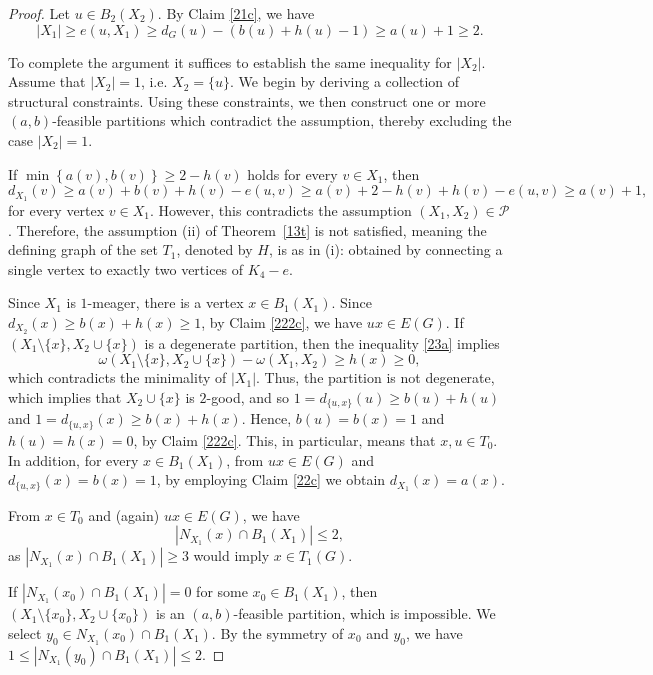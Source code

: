 \documentclass[10pt,a4paper]{amsart}
\begin{document}
\begin{proof} Let   $ u\in B_2(X_2) $. By Claim \ref{21c}, we have   $$ \left| X_1 \right|\ge e(u,X_1)\ge d_G(u)-(b(u)+h(u)-1)\ge a(u)+1\ge2.$$ 

To complete the argument it suffices to establish the same inequality for $|X_2|$.  Assume that $|X_2|=1$, i.e. $X_2=\{u\}$.  We begin by deriving a collection of structural constraints. Using these constraints, we then construct one or more $(a,b)$-feasible partitions which contradict the assumption, thereby excluding the case $|X_2|=1$.



If $\min \left\lbrace a(v),b(v)\right\rbrace\ge 2-h(v)$ holds for every $v\in X_1$, then  $$d_{X_1}(v)\ge a(v)+b(v)+h(v)-e(u,v)\ge a(v)+2-h(v)+h(v)-e(u,v)\ge a(v)+1,$$ for every vertex $ v\in X_1 $. However, this contradicts the assumption $(X_1,X_2)\in\mathcal{P}$. Therefore, the assumption (ii) of Theorem~\ref{13t} is not satisfied, meaning the defining graph of the set $T_1$, denoted by $H$, is as in (i): obtained   by connecting a single vertex to exactly two vertices of $ K_{4} -e $. 

   Since $ X_1 $ is $ 1 $-meager, there is a vertex $x\in B_1(X_1)$. Since  $ d_{X_2}(x)\ge b(x)+h(x)\ge 1 $, by Claim \ref{222c},  we have $ux\in E(G)$. If $ (X_1\setminus\{x\}, X_2\cup\{x\}) $ is a degenerate partition, then the inequality \eqref{23a} implies $$ \omega(X_1\setminus\{x\}, X_2\cup\{x\})-\omega(X_1,X_2)\ge h(x)\ge 0,$$ which contradicts  the minimality of $| X_1|$. Thus, the partition is not degenerate, which implies that $X_2\cup\{x\}$ is $2$-good, and so $1=d_{\{u,x\}}(u)\ge b(u)+h(u)$ and
$1=d_{\{u,x\}}(x)\ge b(x)+h(x)$. Hence, $b(u)=b(x)=1$ and $h(u)=h(x)=0$, by Claim \ref{222c}. This, in particular, means that $x,u\in T_0$. In addition, for every  $x\in B_1(X_1)$, from  $ux\in E(G)$  and $d_{\{u,x\}}(x)=b(x)=1$, by employing  Claim \ref{22c} we obtain $d_{X_1}(x)=a(x)$.  


From $x\in T_0$ and (again) $ux\in E(G)$, we have $$\left| N_{X_1}(x)\cap B_1(X_1)\right|\le 2,$$
as  $ \left| N_{X_1}(x)\cap B_1(X_1)\right|\ge 3 $ would imply $ x\in T_1(G) $.

 If $ \left| N_{X_1}(x_0)\cap B_1(X_1)\right|=0$ for some $x_0\in B_1(X_1)$, then $(X_1\setminus \{x_0\}, X_2\cup \{x_0\})$ is an $(a,b)$-feasible partition, which is impossible. We select $y_0\in N_{X_1}(x_0)\cap B_1(X_1)$.  By the symmetry of $x_0$ and $y_0$, we have $1\le  \left| N_{X_1}(y_0)\cap B_1(X_1)\right|\le 2$.


\end{proof}
\end{document}
